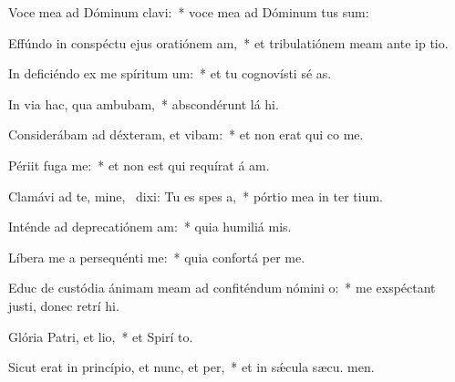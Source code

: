 \item Voce mea ad Dóminum clavi:~* voce mea ad Dóminum tus sum:
\item Effúndo in conspéctu ejus oratiónem am,~* et tribulatiónem meam ante ip tio.
\item In deficiéndo ex me spíritum um:~* et tu cognovísti sé as.
\item In via hac, qua ambubam,~* abscondérunt lá hi.
\item Considerábam ad déxteram, et vibam:~* et non erat qui co me.
\item Périit fuga  me:~* et non est qui requírat á am.
\item Clamávi ad te, mine,~\pscross{} dixi: Tu es spes a,~* pórtio mea in ter tium.
\item Inténde ad deprecatiónem am:~* quia humiliá  mis.
\item Líbera me a persequénti me:~* quia confortá  per me.
\item Educ de custódia ánimam meam ad confiténdum nómini o:~* me exspéctant justi, donec retrí hi.
\item Glória Patri, et lio,~* et Spirí to.
\item Sicut erat in princípio, et nunc, et per,~* et in sǽcula sæcu. men.
